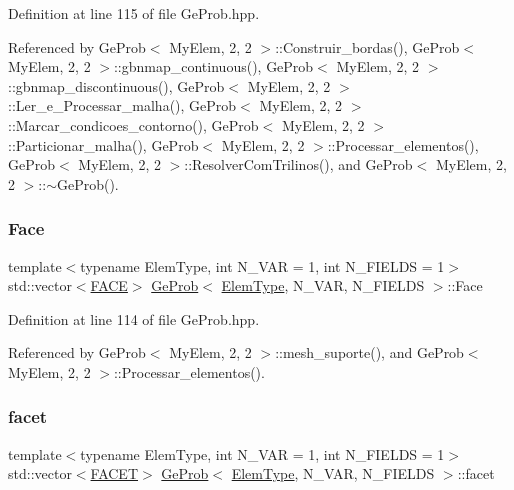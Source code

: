 Definition at line 115 of file Ge\+Prob.\+hpp.



Referenced by Ge\+Prob$<$ My\+Elem, 2, 2 $>$\+::\+Construir\+\_\+bordas(), Ge\+Prob$<$ My\+Elem, 2, 2 $>$\+::gbnmap\+\_\+continuous(), Ge\+Prob$<$ My\+Elem, 2, 2 $>$\+::gbnmap\+\_\+discontinuous(), Ge\+Prob$<$ My\+Elem, 2, 2 $>$\+::\+Ler\+\_\+e\+\_\+\+Processar\+\_\+malha(), Ge\+Prob$<$ My\+Elem, 2, 2 $>$\+::\+Marcar\+\_\+condicoes\+\_\+contorno(), Ge\+Prob$<$ My\+Elem, 2, 2 $>$\+::\+Particionar\+\_\+malha(), Ge\+Prob$<$ My\+Elem, 2, 2 $>$\+::\+Processar\+\_\+elementos(), Ge\+Prob$<$ My\+Elem, 2, 2 $>$\+::\+Resolver\+Com\+Trilinos(), and Ge\+Prob$<$ My\+Elem, 2, 2 $>$\+::$\sim$\+Ge\+Prob().

\mbox{\label{classGeProb_af050a3c4e639bd19028c49877aa10583}} 
\subsubsection{\texorpdfstring{Face}{Face}}
{\footnotesize\ttfamily template$<$typename Elem\+Type, int N\+\_\+\+V\+AR = 1, int N\+\_\+\+F\+I\+E\+L\+DS = 1$>$ \\
std\+::vector$<$\hyperlink{structFACE}{F\+A\+CE}$>$ \hyperlink{classGeProb}{Ge\+Prob}$<$ \hyperlink{spectral_8h_aaa2c1a7b2d1b12c590d730fe6ac839fa}{Elem\+Type}, N\+\_\+\+V\+AR, N\+\_\+\+F\+I\+E\+L\+DS $>$\+::Face\hspace{0.3cm}{\ttfamily [protected]}}



Definition at line 114 of file Ge\+Prob.\+hpp.



Referenced by Ge\+Prob$<$ My\+Elem, 2, 2 $>$\+::mesh\+\_\+suporte(), and Ge\+Prob$<$ My\+Elem, 2, 2 $>$\+::\+Processar\+\_\+elementos().

\mbox{\label{classGeProb_a876f8c65be4b17f3c2b7b4b0605f34c1}} 
\subsubsection{\texorpdfstring{facet}{facet}}
{\footnotesize\ttfamily template$<$typename Elem\+Type, int N\+\_\+\+V\+AR = 1, int N\+\_\+\+F\+I\+E\+L\+DS = 1$>$ \\
std\+::vector$<$\hyperlink{structFACET}{F\+A\+C\+ET}$>$ \hyperlink{classGeProb}{Ge\+Prob}$<$ \hyperlink{spectral_8h_aaa2c1a7b2d1b12c590d730fe6ac839fa}{Elem\+Type}, N\+\_\+\+V\+AR, N\+\_\+\+F\+I\+E\+L\+DS $>$\+::facet\hspace{0.3cm}{\ttfamily [protected]}}



